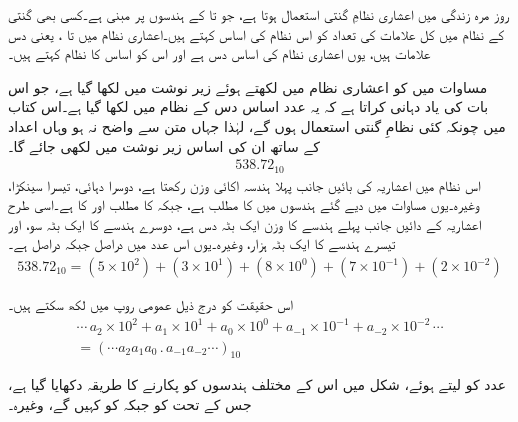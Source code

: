 

روز مرہ  زندگی میں اعشاری نظامِ گنتی  استعمال ہوتا ہے،  جو   تا   کے ہندسوں پر مبنی ہے۔کسی بھی گنتی کے نظام میں کل علامات کی تعداد کو اس نظام کی  اساس  کہتے ہیں۔اعشاری نظام   میں  تا ،  یعنی دس  علامات ہیں، یوں اعشاری نظام کی  اساس دس ہے اور اس  کو اساس   کا نظام کہتے ہیں۔

	مساوات   میں    کو  اعشاری نظام میں لکھتے ہوئے زیر نوشت  میں    لکھا گیا ہے، جو  اس بات کی یاد دہانی کراتا ہے کہ یہ عدد  اساس دس کے نظام میں لکھا گیا ہے۔اس کتاب میں چونکہ کئی نظامِ گنتی استعمال ہوں گے،  لہٰذا جہاں متن سے واضح نہ ہو وہاں اعداد کے ساتھ ان کی  اساس زیر نوشت میں لکھی  جائے گا۔
\begin{align}\label{مساوات_ثنائی_عدد}
538.72_{10}
\end{align}
اس نظام میں اعشاریہ کی بائیں جانب پہلا ہندسہ اکائی وزن رکھتا ہے، دوسرا دہائی، تیسرا سینکڑا،  وغیرہ۔یوں مساوات    میں  دیے گئے ہندسوں میں     کا 
مطلب     ہے،  جبکہ       کا مطلب      اور     کا      ہے۔اسی طرح اعشاریہ کے دائیں جانب پہلے  ہندسے   کا وزن ایک بٹہ دس ہے، دوسرے  ہندسے  کا ایک بٹہ سو،  اور تیسرے ہندسے کا ایک بٹہ ہزار،  وغیرہ۔یوں  اس عدد میں    دراصل    جبکہ    دراصل    ہے۔
\begin{align}\label{مساوات_ثنائی_سینکڑا}
538.72_{10}=(5\times 10^2)+(3\times 10^1)+(8\times 10^0)+(7\times 10^{-1})+(2\times 10^{-2})
\end{align}

اس حقیقت  کو درج ذیل  عمومی روپ  میں   لکھ سکتے ہیں۔
\begin{multline}\label{مساوات_ثنائی_عمومی_روپ}
\cdots \,a_2\times 10^2+a_1\times 10^1+a_0\times 10^0+a_{-1}\times 10^{-1}+a_{-2}\times 10^{-2}\, \cdots\\
=(\cdots a_2a_1a_0\, .\, a_{-1}a_{-2}\cdots)_{10}
\end{multline}

 عدد   کو    لیتے   ہوئے، شکل     میں اس  کے مختلف ہندسوں کو پکارنے  کا طریقہ دکھایا گیا ہے،   جس کے تحت   کو   جبکہ    کو  کہیں گے، وغیرہ۔

